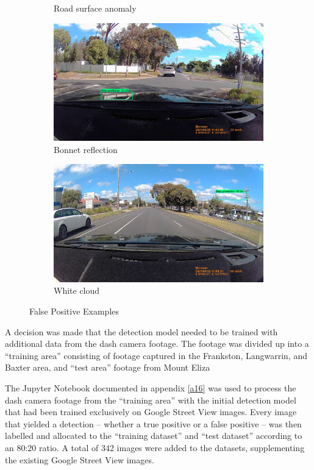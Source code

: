 \documentclass[11pt,twoside]{report}
\begin{document}
\begin{figure}[h]
\begin{subfigure}{0.3\textwidth}
	\caption{Road surface anomaly}
\end{subfigure}
\hfill
\begin{subfigure}{0.3\textwidth}
	\includegraphics[width=\textwidth]{f005_false_positive_reflection.jpg}
	\caption{Bonnet reflection}
\end{subfigure}
\begin{subfigure}{0.3\textwidth}
	\includegraphics[width=\textwidth]{f005_false_positive_random_sky.jpg}
	\caption{White cloud}
\end{subfigure}
\caption{False Positive Examples}
\label{fig:false_positives}
\end{figure}

A decision was made that the detection model needed to be trained with additional data from the dash camera footage.  The footage was divided up into a ``training area'' consisting of footage captured in the Frankston, Langwarrin, and Baxter area, and ``test area'' footage from Mount Eliza

The Jupyter Notebook documented in appendix \ref{a16} was used to process the dash camera footage from the ``training area'' with the initial detection model that had been trained exclusively on Google Street View images.  Every image that yielded a detection -- whether a true positive or a false positive -- was then labelled and allocated to the ``training dataset'' and ``test dataset'' according to an 80:20 ratio.  A total of 342 images were added to the datasets, supplementing the existing Google Street View images.
\end{document}
